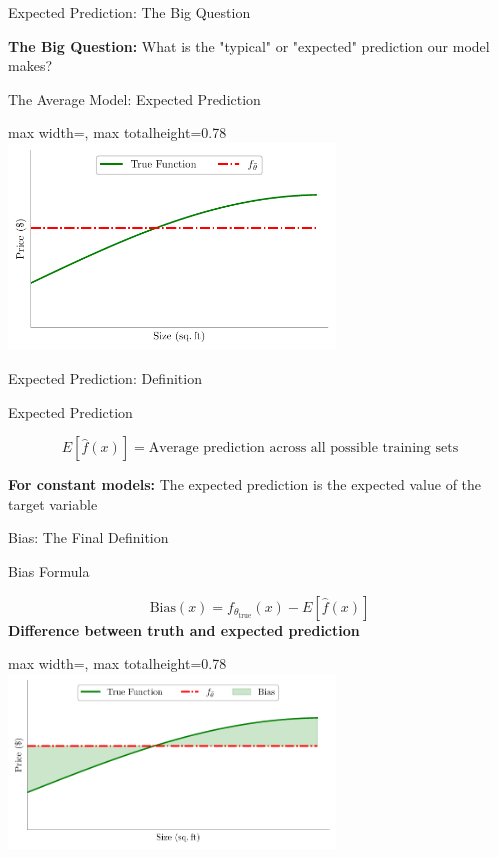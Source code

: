 \documentclass[10pt]{beamer}
\newcommand{\fitpic}[1]{\begin{adjustbox}{max width=\linewidth, max totalheight=0.78\textheight}#1\end{adjustbox}}
\begin{document}
\begin{frame}{Expected Prediction: The Big Question}
\footnotesize
\begin{examplebox}
\raggedright
\textbf{The Big Question:} What is the "typical" or "expected" prediction our model makes?
\end{examplebox}
\end{frame}

\begin{frame}{The Average Model: Expected Prediction}
\footnotesize
\begin{center}
\fitpic{\includegraphics[width=0.65\textwidth]{../assets/bias-variance/figures/bias5_latexify.pdf}}
\end{center}
\end{frame}

\begin{frame}{Expected Prediction: Definition}
\footnotesize
\begin{definitionbox}{Expected Prediction}
\raggedright
$$E[\hat{f}(x)] = \text{Average prediction across all possible training sets}$$
\end{definitionbox}

\begin{keypointsbox}
\raggedright
\textbf{For constant models:} The expected prediction is the expected value of the target variable
\end{keypointsbox}
\end{frame}


\begin{frame}{Bias: The Final Definition}
\small
\begin{definitionbox}{Bias Formula}
\raggedright
$$\text{Bias}(x) = f_{\theta_{\text{true}}}(x) - E[\hat{f}(x)]$$
\textbf{Difference between truth and expected prediction}
\end{definitionbox}

\begin{center}
\fitpic{\includegraphics[width=0.65\textwidth]{../assets/bias-variance/figures/bias6_latexify.pdf}}
\end{center}
\end{frame}
\end{document}
